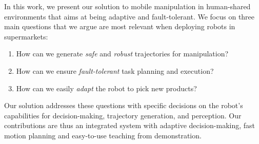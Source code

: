 In this work, we present our solution to mobile manipulation
in human-shared environments that aims at being adaptive and fault-tolerant. %
We  focus on three main questions that we argue are most 
relevant when deploying robots in supermarkets:

\begin{enumerate}
  \item How can we generate \emph{safe} and \emph{robust} trajectories for manipulation? %
  \item How can we ensure \emph{fault-tolerant} task planning and execution? %
  \item How can we easily \emph{adapt} the robot to pick new products? %
\end{enumerate}
Our solution addresses these questions with specific decisions on the robot's capabilities for decision-making, trajectory generation, and perception. Our contributions are thus an integrated system with adaptive decision-making, fast motion planning and easy-to-use teaching from demonstration. 





